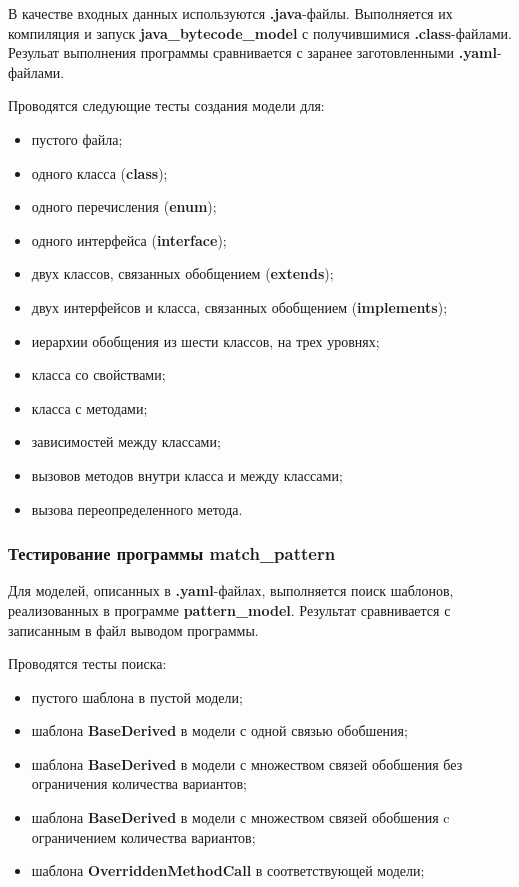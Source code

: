 В качестве входных данных используются \textbf{.java}-файлы.
Выполняется их компиляция и запуск \textbf{java\_bytecode\_model} с
получившимися \textbf{.class}-файлами.
Резульат выполнения программы сравнивается с заранее заготовленными
\textbf{.yaml}-файлами.

Проводятся следующие тесты создания модели для:
\begin{itemize}
\item пустого файла;
\item одного класса (\textbf{class});
\item одного перечисления (\textbf{enum});
\item одного интерфейса (\textbf{interface});
\item двух классов, связанных обобщением (\textbf{extends});
\item двух интерфейсов и класса, связанных обобщением (\textbf{implements});
\item иерархии обобщения из шести классов, на трех уровнях;
\item класса со свойствами;
\item класса с методами;
\item зависимостей между классами;
\item вызовов методов внутри класса и между классами;
\item вызова переопределенного метода.
\end{itemize}

\subsubsection{Тестирование программы match\_pattern}

Для моделей, описанных в \textbf{.yaml}-файлах, выполняется поиск шаблонов,
реализованных в программе \textbf{pattern\_model}.
Результат сравнивается с записанным в файл выводом программы.

Проводятся тесты поиска:
\begin{itemize}
\item пустого шаблона в пустой модели;
\item шаблона \textbf{BaseDerived} в модели с одной связью обобшения;
\item шаблона \textbf{BaseDerived} в модели с множеством связей обобшения
без ограничения количества вариантов;
\item шаблона \textbf{BaseDerived} в модели с множеством связей обобшения
c ограничением количества вариантов;
\item шаблона \textbf{OverriddenMethodCall} в соответствующей модели;
\end{itemize}
